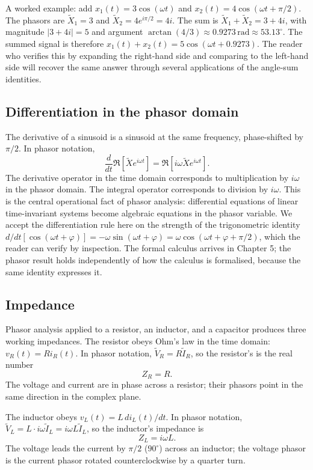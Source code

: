 A worked example: add $x_{1}(t) = 3\cos(\omega t)$ and
$x_{2}(t) = 4\cos(\omega t + \pi/2)$. The phasors are
$\tilde{X}_{1} = 3$ and $\tilde{X}_{2} = 4 e^{i\pi/2} = 4i$. The
sum is $\tilde{X}_{1} + \tilde{X}_{2} = 3 + 4i$, with magnitude
$|3 + 4i| = 5$ and argument $\arctan(4/3) \approx 0.9273
\,\text{rad} \approx 53.13^{\circ}$. The summed signal is therefore
$x_{1}(t) + x_{2}(t) = 5\cos(\omega t + 0.9273)$. The reader who
verifies this by expanding the right-hand side and comparing to
the left-hand side will recover the same answer through several
applications of the angle-sum identities.

\subsection{Differentiation in the phasor domain}

The derivative of a sinusoid is a sinusoid at the same frequency,
phase-shifted by $\pi/2$. In phasor notation,
\[
\frac{d}{dt}\Re[\tilde{X} e^{i\omega t}] = \Re\left[i\omega \tilde{X} e^{i\omega t}\right].
\]
The derivative operator in the time domain corresponds to
multiplication by $i\omega$ in the phasor domain. The integral
operator corresponds to division by $i\omega$. This is the central
operational fact of phasor analysis: differential equations of
linear time-invariant systems become algebraic equations in the
phasor variable. We accept the differentiation rule here on the
strength of the trigonometric identity
$d/dt[\cos(\omega t + \varphi)] = -\omega\sin(\omega t + \varphi) =
\omega\cos(\omega t + \varphi + \pi/2)$, which the reader can
verify by inspection. The formal calculus arrives in Chapter 5;
the phasor result holds independently of how the calculus is
formalised, because the same identity expresses it.

\subsection{Impedance}

Phasor analysis applied to a resistor, an inductor, and a
capacitor produces three working impedances. The resistor obeys
Ohm's law in the time domain: $v_{R}(t) = R i_{R}(t)$. In phasor
notation, $\tilde{V}_{R} = R \tilde{I}_{R}$, so the resistor's
 is the real number
\[
Z_{R} = R.
\]
The voltage and current are in phase across a resistor; their
phasors point in the same direction in the complex plane.

The inductor obeys $v_{L}(t) = L \, di_{L}(t)/dt$. In phasor
notation, $\tilde{V}_{L} = L \cdot i\omega \tilde{I}_{L} = i\omega
L \tilde{I}_{L}$, so the inductor's impedance is
\[
Z_{L} = i\omega L.
\]
The voltage leads the current by $\pi/2$ ($90^{\circ}$) across an
inductor; the voltage phasor is the current phasor rotated
counterclockwise by a quarter turn.

